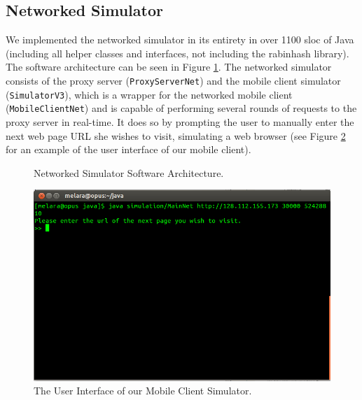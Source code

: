\subsection{Networked Simulator}
\label{sec:netsim}
We implemented the networked simulator in its entirety in over 1100 sloc of Java (including all helper classes and interfaces, not including the rabinhash library). The software architecture can be seen in Figure \ref{fig:netsim_arch}. The networked simulator consists of the proxy server (\texttt{ProxyServerNet}) and the mobile client simulator (\texttt{SimulatorV3}), which is a wrapper for the networked mobile client (\texttt{MobileClientNet}) and is capable of performing several rounds of requests to the proxy server in real-time. It does so by prompting the user to manually enter the next web page URL she wishes to visit, simulating a web browser (see Figure \ref{fig:mobsim_ui} for an example of the user interface of our mobile client).

\begin{figure}[h] 
\caption{Networked Simulator Software Architecture.}
\label{fig:netsim_arch}
\end{figure}

\begin{figure}[h] 
\centering \includegraphics[scale=0.40]{images/mobilesim_ui.png}
\caption{The User Interface of our Mobile Client Simulator.}
\label{fig:mobsim_ui}
\end{figure}

